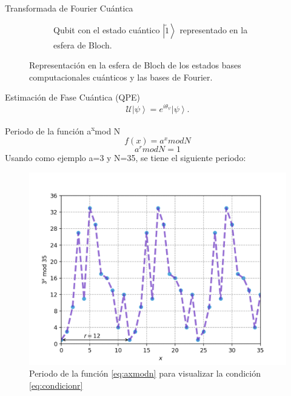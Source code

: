 \begin{frame}{Transformada de Fourier Cuántica}
\begin{figure}[H]
\begin{subfigure}{0.49\linewidth}
        \caption{Qubit con el estado cuántico $\left|\tilde{1} \right\rangle$ representado en la esfera de Bloch.}
    \end{subfigure}
\caption{Representación en la esfera de Bloch de los estados bases computacionales cuánticos y las bases de Fourier.}
\label{fig:QFT_bloch}
\end{figure}
\end{frame}
\begin{frame}{Estimación de Fase Cuántica (QPE)}
    \begin{equation*}
    \mathcal{U} \left|\psi \right\rangle = e^{i\theta_\psi}\left|\psi \right\rangle.
\end{equation*}
\end{frame}
\begin{frame}{Periodo de la función a\textsuperscript{x}mod N}
    \begin{equation}
        f(x)=a^xmod N
        \label{eq:axmodn}
        \end{equation}
    \begin{equation}
        a^rmodN=1
        \label{eq:condicionr}
    \end{equation}
Usando como ejemplo a=3 y N=35, se tiene el siguiente periodo:
\begin{figure}[H]
    \centering
    \includegraphics[scale=0.35]{images/period.png}
    \caption{Periodo de la función \ref{eq:axmodn} para visualizar la condición \ref{eq:condicionr}}
    \label{fig:condicionr}
\end{figure}
\end{frame}
